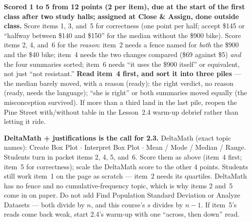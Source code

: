 \documentclass[10pt]{article}
\begin{document}
\begin{teachernote}[Homework]
\textbf{Scored 1 to 5 from 12 points (2 per item), due at the start of the first class after two study
halls; assigned at Close \& Assign, done outside class.} Score items 1, 3, and~5 for
correctness (one point per half; accept \$145 or ``halfway between \$140 and \$150'' for the
median without the \$900 bike). Score items 2, 4, and~6 for the \emph{reason}: item~2 needs a
fence named for \emph{both} the \$900 and the \$40 bike; item~4 needs the two changes compared
(\$69 against \$5) \emph{and} the four summaries sorted; item~6 needs ``it uses the \$900
itself'' or equivalent, not just ``not resistant.'' \textbf{Read item~4 first, and sort it into
three piles} --- the median barely moved, with a reason (ready); the right verdict, no reason
(ready, needs the language); ``she is right'' or both summaries moved equally (the misconception
survived). If more than a third land in the last pile, reopen the Pine Street with/without
table in the Lesson~2.4 warm-up debrief rather than letting it ride.

\textbf{DeltaMath + justifications is the call for 2.3.} DeltaMath (exact topic names): Create
Box Plot $\cdot$ Interpret Box Plot $\cdot$ Mean / Mode / Median / Range. Students turn in packet
items 2, 4, 5, and~6. Score them as above (item~4 first; item~5 for correctness); scale the
DeltaMath score to the other 4 points. Students still work item~1 on the page as scratch ---
item~2 needs its quartiles. DeltaMath has no fence and no cumulative-frequency topic, which is
why items 2 and~5 come in on paper. Do not add Find Population Standard Deviation or Analyze Datasets --- both divide by $n$, and this course's $s$ divides by $n - 1$. If item~5's reads come back weak, start
2.4's warm-up with one ``across, then down'' read.
\end{teachernote}
\end{document}
